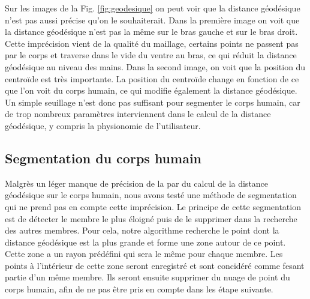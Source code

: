 Sur les images de la Fig. \ref{fig:geodesique} on peut voir que la distance géodésique n'est pas aussi précise qu'on le souhaiterait.
Dans la première image on voit que la distance géodésique n'est pas la même sur le bras gauche et sur le bras droit. Cette imprécision
vient de la qualité du maillage, certains points ne passent pas par le corps et traverse dans le vide du ventre au bras, ce qui réduit
la distance géodésique au niveau des mains. Dans la second image, on voit que la position du centroïde est très importante. La position
du centroïde change en fonction de ce que l'on voit du corps humain, ce qui modifie également la distance géodésique. Un simple seuillage
n'est donc pas suffisant pour segmenter le corps humain, car de trop nombreux paramètres interviennent dans le calcul de la distance géodésique,
y compris la physionomie de l'utilisateur.

\subsection{Segmentation du corps humain}
Malgrès un léger manque de précision de la par du calcul de la distance géodésique sur le corps humain, nous avons testé une
méthode de segmentation qui ne prend pas en compte cette imprécision. Le principe de cette segmentation est de détecter le
membre le plus éloigné puis de le supprimer dans la recherche des autres membres. Pour cela, notre algorithme recherche le point
dont la distance géodésique est la plus grande et forme une zone autour de ce point. Cette zone a un rayon prédéfini qui sera le 
même pour chaque membre. Les points à l'intérieur de cette zone seront enregistré et sont concidéré comme fesant partie d'un 
même membre. Ils seront ensuite supprimer du nuage de point du corps humain, afin de ne pas être pris en compte dans les 
étape suivante.\\

